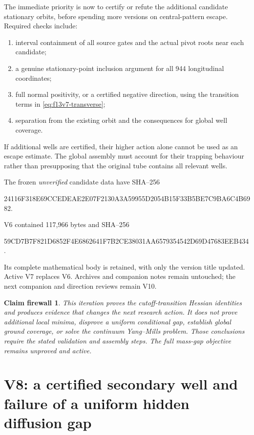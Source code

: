\documentclass[11pt,oneside]{article}
\newtheorem{firewall}[theorem]{Claim firewall}
\begin{document}
The immediate priority is now to certify
or refute the additional candidate stationary
orbits, before spending more versions on
central-pattern escape. Required checks include:
\begin{enumerate}
\item interval containment of all source gates
and the actual pivot roots near each candidate;
\item a genuine stationary-point inclusion
argument for all 944 longitudinal coordinates;
\item full normal positivity, or a certified
negative direction, using the transition
terms in \eqref{eq:f13v7-transverse};
\item separation from the existing orbit and
the consequences for global well coverage.
\end{enumerate}
If additional wells are certified, their
higher action alone cannot be used as an
escape estimate. The global assembly must
account for their trapping behaviour rather
than presupposing that the original tube
contains all relevant wells.

The frozen \emph{unverified} candidate data
have SHA--256
\begin{center}\scriptsize\ttfamily
24116F318E69CCEDEAE2E07F2130A3A59955D2054B15F33B5BE7C9BA6C4B6982.
\end{center}
V6 contained 117,966 bytes and SHA--256
\begin{center}\scriptsize\ttfamily
59CD7B7F821D6852F4E6862641F7B2CE38031AA6579354542D69D47683EEB434.
\end{center}
Its complete mathematical body is retained,
with only the version title updated. Active
V7 replaces V6. Archives and companion
notes remain untouched; the next companion
and direction reviews remain V10.

\begin{firewall}
This iteration proves the cutoff-transition
Hessian identities and produces evidence
that changes the next research action.
It does not prove additional local minima,
disprove a uniform conditional gap, establish
global ground coverage, or solve the continuum
Yang--Mills problem. Those conclusions require
the stated validation and assembly steps.
The full mass-gap objective remains unproved
and active.
\end{firewall}
\section{V8: a certified secondary well and failure of a uniform hidden diffusion gap}
\label{sec:f13v8}
\end{document}
